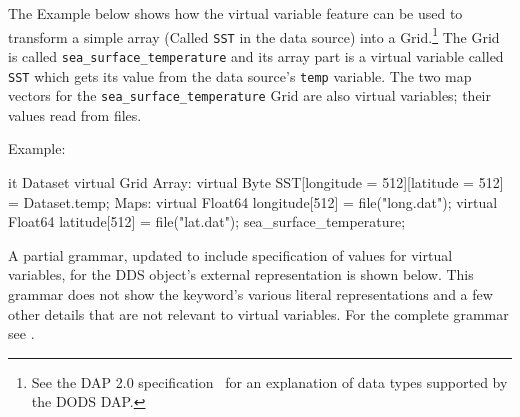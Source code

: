 \documentclass{article}
\begin{document}
The Example below shows how the virtual variable feature can be used to
transform a simple array (Called \texttt{SST} in the data source) into
a Grid.\footnote{See the DAP 2.0 specification~\cite{gallagher:dap-spec}
for an explanation of data types supported by the \ac{DODS}
\ac{DAP}.} The Grid is called \texttt{sea\_surface\_temperature} and
its array part is a virtual variable called \texttt{SST} which gets
its value from the data source's \texttt{temp} variable. The two map
vectors for the \texttt{sea\_surface\_temperature} Grid are also
virtual variables; their values read from files.

\cbstart
Example:\\
\begin{vcode}{it}
Dataset {
    virtual Grid {
      Array:
        virtual Byte SST[longitude = 512][latitude = 512] = Dataset.temp;
      Maps:
        virtual Float64 longitude[512] = file("long.dat");
        virtual Float64 latitude[512] = file("lat.dat");
    } sea_surface_temperature;
}
\end{vcode}

A partial grammar, updated to include specification of values for virtual
variables, for the DDS object's external representation is shown below. This
grammar does not show the keyword's various literal representations and a few
other details that are not relevant to virtual variables. For the complete
grammar see \cite{gallagher:dap-spec}.
\end{document}
